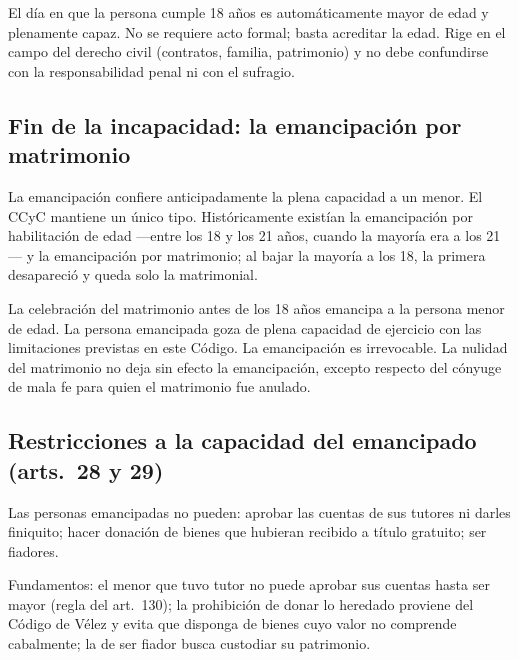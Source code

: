\documentclass[12pt,oneside]{book}
\begin{document}
\begin{importante}
El día en que la persona cumple 18 años es automáticamente mayor de edad y plenamente capaz. No se requiere acto formal; basta acreditar la edad. Rige en el campo del derecho civil (contratos, familia, patrimonio) y no debe confundirse con la responsabilidad penal ni con el sufragio.
\end{importante}

\subsection{Fin de la incapacidad: la emancipación por matrimonio}

La emancipación confiere anticipadamente la plena capacidad a un menor. El CCyC mantiene un único tipo. Históricamente existían la emancipación por habilitación de edad ---entre los 18 y los 21 años, cuando la mayoría era a los 21--- y la emancipación por matrimonio; al bajar la mayoría a los 18, la primera desapareció y queda solo la matrimonial.

\begin{regla}
La celebración del matrimonio antes de los 18 años emancipa a la persona menor de edad. La persona emancipada goza de plena capacidad de ejercicio con las limitaciones previstas en este Código. La emancipación es irrevocable. La nulidad del matrimonio no deja sin efecto la emancipación, excepto respecto del cónyuge de mala fe para quien el matrimonio fue anulado.
\end{regla}

\subsection{Restricciones a la capacidad del emancipado (arts.~28 y 29)}

\begin{regla}
Las personas emancipadas no pueden: aprobar las cuentas de sus tutores ni darles finiquito; hacer donación de bienes que hubieran recibido a título gratuito; ser fiadores.
\end{regla}

Fundamentos: el menor que tuvo tutor no puede aprobar sus cuentas hasta ser mayor (regla del art.~130); la prohibición de donar lo heredado proviene del Código de Vélez y evita que disponga de bienes cuyo valor no comprende cabalmente; la de ser fiador busca custodiar su patrimonio.
\end{document}
